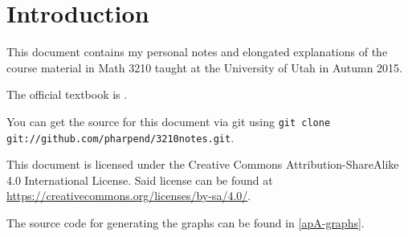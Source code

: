 \chapter{Introduction}

This document contains my personal notes and elongated explanations of the
course material in Math 3210 taught at the University of Utah in Autumn 2015.

The official textbook is \textbf{}.

You can get the source for this document via git using \texttt{git clone
  git://github.com/pharpend/3210notes.git}.

This document is licensed under the Creative Commons Attribution-ShareAlike 4.0
International License. Said license can be found at
\url{https://creativecommons.org/licenses/by-sa/4.0/}.

The source code for generating the graphs can be found in \cref{apA-graphs}.